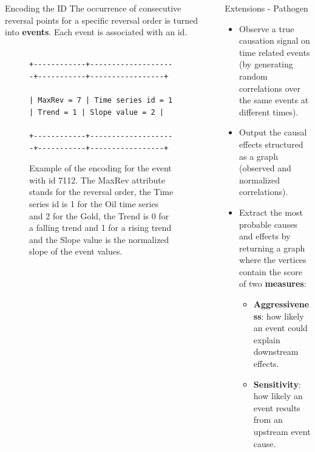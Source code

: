 \documentclass[final]{beamer}
\newlength{\sepwidth}
\newlength{\colwidth}
\newcommand{\separatorcolumn}{\begin{column}{\sepwidth}\end{column}}
\begin{document}
\begin{frame}[fragile]
\begin{columns}[t]
\begin{column}{\colwidth}
   
   \begin{block}{Encoding the ID}
The occurrence of consecutive reversal points for a specific reversal order is turned into \textsf{\textbf{events}}. Each event is associated with an id.


\begin{figure}
\begin{BVerbatim}[baselinestretch=0.1,fontsize=\small]

+------------+--------------------+-----------+-----------------+

| MaxRev = 7 | Time series id = 1 | Trend = 1 | Slope value = 2 |

+------------+--------------------+-----------+-----------------+

\end{BVerbatim}
    
\caption{Example of the encoding for the event with id 7112. The MaxRev attribute stands for the reversal order, the Time series id is 1 for the Oil time series and 2 for the Gold, the Trend is 0 for a falling trend and 1 for a rising trend and the Slope value is the normalized slope of the event values.}
\label{fig:ID}
 \end{figure}

\end{block}
\end{column}
\separatorcolumn



\begin{column}{\colwidth}

  \begin{block}{Extensions - Pathogen}
    \begin{itemize}
        \item Observe a true causation signal on time related events (by generating random correlations over the same events at different times).
        \item Output the causal effects structured as a graph (observed and normalized correlations).
        \item Extract the most probable causes and effects by returning a graph where the vertices contain the score of two \textsf{\textbf{measures}}:\newline
        \begin{itemize}
            \item \textsf{\textbf{Aggressiveness}}: how likely an event could explain downstream effects.
            \vspace{0.3in}
            \item \textsf{\textbf{Sensitivity}}: how likely an event results from an upstream event cause.


\end{itemize}
\end{itemize}
\end{block}
\end{column}
\end{columns}
\end{frame}
\end{document}
